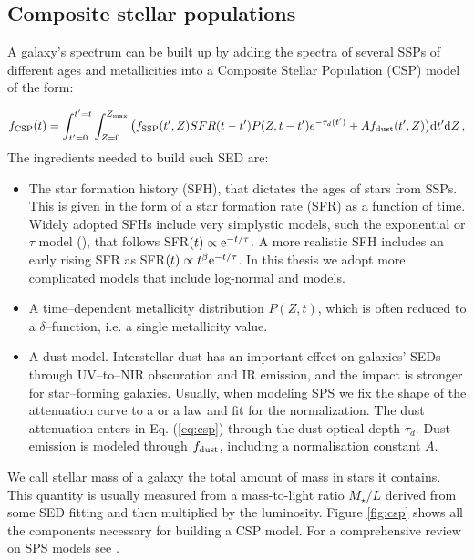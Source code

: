 \subsection{Composite stellar populations}

A galaxy's spectrum can be built up by adding the spectra of several SSPs of different ages and metallicities into a Composite Stellar Population (CSP) model of the form:

\begin{equation}
f_{\rm CSP} (t) = \int^{t'=t}_{t'=0} \int^{Z_{\rm max}}_{Z=0} \big(  f_{\rm SSP}(t',Z)  SFR(t-t')P(Z,t-t')e^{-\tau_d(t')}+Af_{\rm dust}(t',Z) \big){\rm d} t' {\rm d} Z\, ,\label{eq:csp}
\end{equation}
The ingredients needed to build such SED are:
\begin{itemize}
\item The star formation history (SFH), that dictates the ages of stars from SSPs. This is given in the form of a star formation rate (SFR) as a function of time. Widely adopted SFHs include very simplystic models, such the exponential or $\tau$ model (\citealt{schmidt}), that follows SFR$(t)\propto {\rm e}^{-t/\tau}$. A more realistic SFH includes an early rising SFR as SFR$(t)\propto t^\beta {\rm e}^{-t/\tau}$. In this thesis we adopt more complicated models that include log-normal and \citet{simha} models.
\item A time--dependent metallicity distribution $P(Z,t)$, which is often reduced to a $\delta$--function, i.e. a single metallicity value.
\item A dust model. Interstellar dust has an important effect on galaxies' SEDs through UV--to--NIR obscuration and IR emission, and the impact is stronger for star--forming galaxies. Usually, when modeling SPS we fix the shape of the attenuation curve to a \citet{calzetti} or a \citet{charlotfall} law and fit for the normalization. The dust attenuation enters in Eq. (\ref{eq:csp}) through the dust optical depth $\tau_d$. Dust emission is modeled through $f_{\rm dust}$, including a normalisation constant $A$.
\end{itemize}
We call stellar mass of a galaxy the total amount of mass in stars it contains. This quantity is usually measured from a mass-to-light ratio $M_\star/L$ derived from some SED fitting and then multiplied by the luminosity.
Figure \ref{fig:csp} shows all the components necessary for building a CSP model. For a comprehensive review on SPS models see \citet{conroy}.

